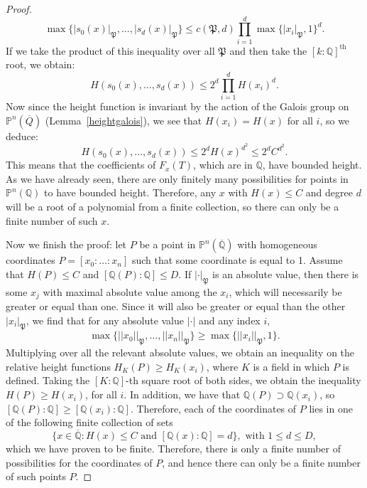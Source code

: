 \documentclass[a4paper, 12pt]{amsart}
\theoremstyle{definition}
\theoremstyle{plain}
\theoremstyle{plain}
\theoremstyle{plain}
\theoremstyle{plain}
\theoremstyle{remark}
\theoremstyle{remark}
\theoremstyle{plain}
\newcommand{\lemref}[1]{Lemma~\ref{#1}}
\newcommand{\Q}{\mathbb{Q}}
\renewcommand{\P}{\mathfrak{P}}
\begin{document}
\begin{proof}
		\begin{equation*}
			\max\{|s_0(x)|_\P,\ldots,|s_d(x)|_\P\}\le c(\P,d)\prod_{i=1}^d\max\{|x_i|_\P,1\}^d.
		\end{equation*}
		If we take the product of this inequality over all $\P$ and then take the $[k:\Q]^{\text{th}}$ root, we obtain:
			\begin{equation*}
				H(s_0(x),\ldots,s_d(x))\le 2^d\prod_{i=1}^dH(x_i)^d.
			\end{equation*}
		Now since the height function is invariant by the action of the Galois group on $\mathbb{P}^n(\overline{Q})$ (\lemref{heightgalois}), we see that $H(x_i)=H(x)$ for all $i$, so we deduce:
		\begin{equation*}
			H(s_0(x),\ldots,s_d(x))\le 2^dH(x)^{d^2}\le 2^dC^{d^2}.
		\end{equation*}
		This means that the coefficients of $F_x(T)$, which are in $\Q$, have bounded height. As we have already seen, there are only finitely many possibilities for points in $\mathbb{P}^n(\Q)$ to have bounded height. Therefore, any $x$ with $H(x)\le C$ and degree $d$ will be a root of a polynomial from a finite collection, so there can only be a finite number of such $x$.
		
		Now we finish the proof: let $P$ be a point in $\mathbb{P}^n(\overline{\Q})$ with homogeneous coordinates $P=[x_0:\ldots:x_n]$ such that some coordinate is equal to 1. Assume that $H(P)\le C$ and $[\Q(P):\Q]\le D$. If $|\cdot|_\P$ is an absolute value, then there is some $x_j$ with maximal absolute value among the $x_i$, which will necessarily be greater or equal than one. Since it will also be greater or equal than the other $|x_i|_\P$, we find that for any absolute value $|\cdot|$ and any index $i$,
		\begin{equation*}
			\max\{||x_0||_\P,\ldots,||x_n||_\P\}\ge \max\{{||x_i||_\P,1}\}.
		\end{equation*}
		Multiplying over all the relevant absolute values, we obtain an inequality on the relative height functions $H_K(P)\ge H_K(x_i)$, where $K$ is a field in which $P$ is defined. Taking the $[K:\Q]$-th square root of both sides, we obtain the inequality $H(P)\ge H(x_i)$, for all $i$. In addition, we have that $\Q(P)\supset\Q(x_i)$, so $[\Q(P):\Q]\ge [\Q(x_i):\Q]$. Therefore, each of the coordinates of $P$ lies in one of the following finite collection of sets
		\begin{equation*}
			\{x\in\overline{\Q}: H(x)\le C\text{ and }[\Q(x):\Q]=d\}, \text{ with } 1\le d\le D,
		\end{equation*}
		which we have proven to be finite. Therefore, there is only a finite number of possibilities for the coordinates of $P$, and hence there can only be a finite number of such points $P$.
	\end{proof}
	
\end{document}
